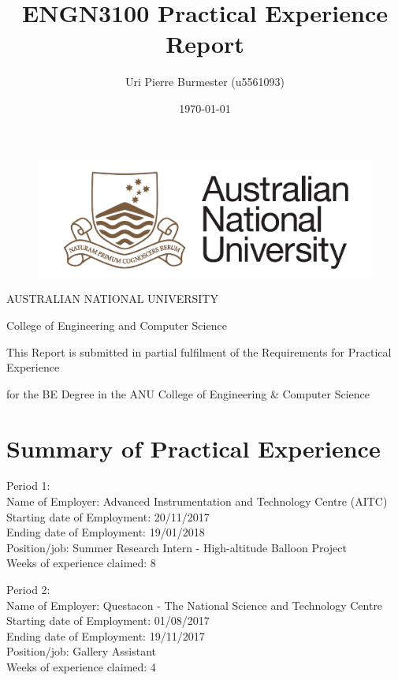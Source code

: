 \documentclass[11pt]{article}
\title{ENGN3100 Practical Experience Report}
\author{Uri Pierre Burmester (u5561093)}
\date{\today}
\begin{document}
\begin{figure} \centering
  \includegraphics[width=0.5\linewidth]{ANU.png}
\end{figure}

\maketitle

\centerline{AUSTRALIAN NATIONAL UNIVERSITY}  
\centerline{College of Engineering and Computer Science} 

\bigskip

\centerline{This Report is submitted in partial fulfilment of the Requirements for Practical Experience}
\centerline{ for the BE Degree in the ANU College of Engineering \& Computer Science}

\newpage

\tableofcontents

\newpage

\section{Summary of Practical Experience}

Period 1: \\
Name of Employer: Advanced Instrumentation and Technology Centre (AITC) \\
Starting date of Employment: 20/11/2017 \\
Ending date of Employment: 19/01/2018 \\
Position/job: Summer Research Intern - High-altitude Balloon Project \\
Weeks of experience claimed: 8 \\

\medskip

Period 2: \\
Name of Employer: Questacon - The National Science and Technology Centre \\
Starting date of Employment: 01/08/2017 \\
Ending date of Employment: 19/11/2017 \\
Position/job: Gallery Assistant \\
Weeks of experience claimed: 4 \\
\end{document}
